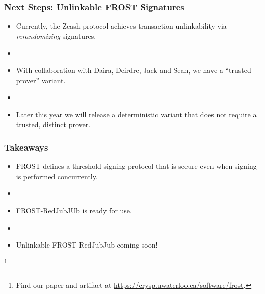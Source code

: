 \documentclass[hyperref={pdfpagelabels=true},table,dvipsnames,14pt,aspectratio=169]{beamer}
\begin{document}
\begin{frame}
  \frametitle{Next Steps: Unlinkable FROST Signatures}

  \begin{itemize}
    \item<1-> Currently, the Zcash protocol achieves transaction unlinkability via \emph{rerandomizing} signatures.
    \item[]
    \item<2-> With collaboration with Daira, Deirdre, Jack and Sean, we have a ``trusted prover'' variant.
    \item[]
    \item<3-> Later this year we will release a deterministic variant that does not require a trusted, distinct prover.
  \end{itemize}
\end{frame}

\begin{frame}
  \frametitle{Takeaways}
  \begin{itemize}
    \item<1-> FROST defines a threshold signing protocol that is
      secure even when signing is performed concurrently.
    \item[]
    \item<2-> FROST-RedJubJUb is ready for use.
    \item[]
    \item<3-> Unlinkable FROST-RedJubJub coming soon!
  \end{itemize}
      \let\thefootnote\relax\footnote{
      Find our paper and artifact at
      \url{https://crysp.uwaterloo.ca/software/frost}.
      }
\end{frame}

\begin{comment}
\begin{frame}
  \huge
  \centering
  EXTRAS
\end{frame}
\end{comment}
\end{document}
